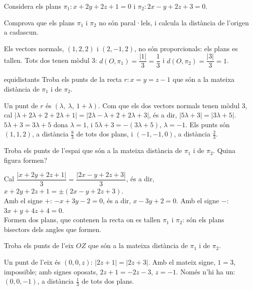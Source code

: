 Considera els plans $\pi_1\colon x+2y+2z+1=0$ i $\pi_2\colon 2x-y+2z+3=0$.

\begin{apartats}

Comprova que els plans $\pi_1$ i $\pi_2$ no són paral·lels, i calcula la distància de l'origen a
cadascun.

\begin{solucio}
Els vectors normals, $(1,2,2)$ i $(2,-1,2)$, no són proporcionals: els plans es tallen. Tots dos tenen
mòdul 3:
$d(O,\pi_1)=\dfrac{|1|}{3}=\dfrac13$ i $d(O,\pi_2)=\dfrac{|3|}{3}=1$.
\end{solucio}

\begin{tria}{equidistants}
Troba els punts de la recta $r\colon x=y=z-1$ que són a la mateixa distància de $\pi_1$ i de
$\pi_2$.

\begin{solucio}
Un punt de $r$ és $(\lambda,\ \lambda,\ 1+\lambda)$. Com que els dos vectors normals tenen mòdul 3, cal
$|\lambda+2\lambda+2+2\lambda+1|=|2\lambda-\lambda+2+2\lambda+3|$, és a dir, $|5\lambda+3|=|3\lambda+5|$.\\
$5\lambda+3=3\lambda+5$ dona $\lambda=1$, i $5\lambda+3=-(3\lambda+5)$, $\lambda=-1$. Els punts són
$(1,1,2)$, a distància $\frac83$ de tots dos plans, i $(-1,-1,0)$, a distància $\frac23$.
\end{solucio}

Troba els punts de l'espai que són a la mateixa distància de $\pi_1$ i de $\pi_2$. Quina figura formen?

\begin{solucio}
Cal $\dfrac{|x+2y+2z+1|}{3}=\dfrac{|2x-y+2z+3|}{3}$, és a dir, $x+2y+2z+1=\pm(2x-y+2z+3)$.\\
Amb el signe $+$: $-x+3y-2=0$, és a dir, $x-3y+2=0$. Amb el signe $-$: $3x+y+4z+4=0$.\\
Formen dos plans, que contenen la recta on es tallen $\pi_1$ i $\pi_2$: són els plans bisectors dels
angles que formen.
\end{solucio}
\end{tria}

\begin{nomesllarg}
Troba els punts de l'eix $OZ$ que són a la mateixa distància de $\pi_1$ i de $\pi_2$.

\begin{solucio}
Un punt de l'eix és $(0,0,z)$: $|2z+1|=|2z+3|$. Amb el mateix signe, $1=3$, impossible; amb signes
oposats, $2z+1=-2z-3$, $z=-1$. Només n'hi ha un: $(0,0,-1)$, a distància $\frac13$ de tots dos plans.
\end{solucio}
\end{nomesllarg}

\end{apartats}
